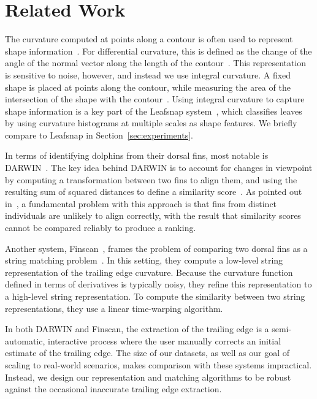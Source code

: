 \documentclass[10pt,twocolumn,letterpaper]{article}
\begin{document}
\section{Related Work}
The curvature computed at points along a contour is often used to represent
shape information~\cite{Monroy11, Kumar12, Fischer14}.  For differential
curvature, this is defined as the change of the angle of the normal vector
along the length of the contour~\cite{Fischer14}.  This representation is
sensitive to noise, however, and instead we use integral curvature.  A fixed
shape is placed at points along the contour, while measuring the area of the
intersection of the shape with the contour~\cite{Pottmann09}.  Using integral
curvature to capture shape information is a key part of the Leafsnap
system~\cite{Kumar12}, which classifies leaves by using curvature histograms at
multiple scales as shape features.  We briefly compare to Leafsnap in
Section~\ref{sec:experiments}.

In terms of identifying dolphins from their dorsal fins, most notable is
DARWIN~\cite{Stanley95}.  The key idea behind DARWIN is to account for changes
in viewpoint by computing a transformation between two fins to align them, and
using the resulting sum of squared distances to define a similarity
score~\cite{Stewman06}.  As pointed out in~\cite{Gilman13}, a fundamental
problem with this approach is that fins from distinct individuals are unlikely
to align correctly, with the result that similarity scores cannot be compared
reliably to produce a ranking.

Another system, Finscan~\cite{Hillman02}, frames the problem of comparing two
dorsal fins as a string matching problem~\cite{Araabi00}.  In this setting,
they compute a low-level string representation of the trailing edge curvature.
Because the curvature function defined in terms of derivatives is typically
noisy, they refine this representation to a high-level string
representation.  To compute the similarity between two string representations,
they use a linear time-warping algorithm.

In both DARWIN and Finscan, the extraction of the trailing edge is a
semi-automatic, interactive process where the user manually corrects an initial
estimate of the trailing edge.  The size of our datasets, as well as our goal
of scaling to real-world scenarios, makes comparison with these
systems impractical.  Instead, we design our representation and matching
algorithms to be robust against the occasional inaccurate trailing edge
extraction.
\end{document}
